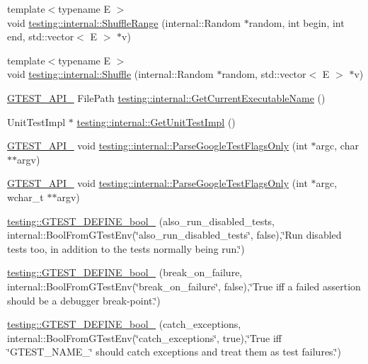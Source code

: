\begin{DoxyCompactItemize}
{\footnotesize template$<$typename E $>$ }\\void \hyperlink{namespacetesting_1_1internal_a0e1d3dc36138a591769412d4c7779861}{testing\-::internal\-::\-Shuffle\-Range} (internal\-::\-Random $\ast$random, int begin, int end, std\-::vector$<$ E $>$ $\ast$v)
\item 
{\footnotesize template$<$typename E $>$ }\\void \hyperlink{namespacetesting_1_1internal_a90d9e6ffe8522a7eb1b2ce9b1a0c4673}{testing\-::internal\-::\-Shuffle} (internal\-::\-Random $\ast$random, std\-::vector$<$ E $>$ $\ast$v)
\item 
\hyperlink{gtest-port_8h_aa73be6f0ba4a7456180a94904ce17790}{G\-T\-E\-S\-T\-\_\-\-A\-P\-I\-\_\-} File\-Path \hyperlink{namespacetesting_1_1internal_a7a2bbf069f75bc99873976ad6fc356ad}{testing\-::internal\-::\-Get\-Current\-Executable\-Name} ()
\item 
Unit\-Test\-Impl $\ast$ \hyperlink{namespacetesting_1_1internal_a9bd0caf5d16512de38b39599c13ee634}{testing\-::internal\-::\-Get\-Unit\-Test\-Impl} ()
\item 
\hyperlink{gtest-port_8h_aa73be6f0ba4a7456180a94904ce17790}{G\-T\-E\-S\-T\-\_\-\-A\-P\-I\-\_\-} void \hyperlink{namespacetesting_1_1internal_a472880afbcc592a41e3d623e2dec8412}{testing\-::internal\-::\-Parse\-Google\-Test\-Flags\-Only} (int $\ast$argc, char $\ast$$\ast$argv)
\item 
\hyperlink{gtest-port_8h_aa73be6f0ba4a7456180a94904ce17790}{G\-T\-E\-S\-T\-\_\-\-A\-P\-I\-\_\-} void \hyperlink{namespacetesting_1_1internal_aa3c81a67914856448d0778990d9d9cab}{testing\-::internal\-::\-Parse\-Google\-Test\-Flags\-Only} (int $\ast$argc, wchar\-\_\-t $\ast$$\ast$argv)
\item 
\hyperlink{namespacetesting_aaead7d1aa21cf4a222e10e4c91c21ee5}{testing\-::\-G\-T\-E\-S\-T\-\_\-\-D\-E\-F\-I\-N\-E\-\_\-bool\-\_\-} (also\-\_\-run\-\_\-disabled\-\_\-tests, internal\-::\-Bool\-From\-G\-Test\-Env(\char`\"{}also\-\_\-run\-\_\-disabled\-\_\-tests\char`\"{}, false),\char`\"{}Run disabled tests too, in addition to the tests normally being run.\char`\"{})
\item 
\hyperlink{namespacetesting_a5c9316c2f726f836c50fcfc1065d718c}{testing\-::\-G\-T\-E\-S\-T\-\_\-\-D\-E\-F\-I\-N\-E\-\_\-bool\-\_\-} (break\-\_\-on\-\_\-failure, internal\-::\-Bool\-From\-G\-Test\-Env(\char`\"{}break\-\_\-on\-\_\-failure\char`\"{}, false),\char`\"{}True iff a failed assertion should be a debugger break-\/point.\char`\"{})
\item 
\hyperlink{namespacetesting_a16f63f28356f1843888013487da9f89d}{testing\-::\-G\-T\-E\-S\-T\-\_\-\-D\-E\-F\-I\-N\-E\-\_\-bool\-\_\-} (catch\-\_\-exceptions, internal\-::\-Bool\-From\-G\-Test\-Env(\char`\"{}catch\-\_\-exceptions\char`\"{}, true),\char`\"{}True iff \char`\"{}G\-T\-E\-S\-T\-\_\-\-N\-A\-M\-E\-\_\-\char`\"{} should catch exceptions and treat them as test failures.\char`\"{})

\end{DoxyCompactItemize}

